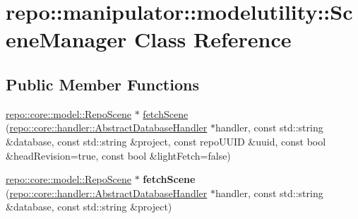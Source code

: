 \hypertarget{classrepo_1_1manipulator_1_1modelutility_1_1_scene_manager}{}\section{repo\+:\+:manipulator\+:\+:modelutility\+:\+:Scene\+Manager Class Reference}
\label{classrepo_1_1manipulator_1_1modelutility_1_1_scene_manager}
\subsection*{Public Member Functions}
\begin{DoxyCompactItemize}
\item 
\hyperlink{classrepo_1_1core_1_1model_1_1_repo_scene}{repo\+::core\+::model\+::\+Repo\+Scene} $\ast$ \hyperlink{classrepo_1_1manipulator_1_1modelutility_1_1_scene_manager_a393159e2171e330dff17c601022b59e6}{fetch\+Scene} (\hyperlink{classrepo_1_1core_1_1handler_1_1_abstract_database_handler}{repo\+::core\+::handler\+::\+Abstract\+Database\+Handler} $\ast$handler, const std\+::string \&database, const std\+::string \&project, const repo\+U\+U\+I\+D \&uuid, const bool \&head\+Revision=true, const bool \&light\+Fetch=false)
\item 
\hypertarget{classrepo_1_1manipulator_1_1modelutility_1_1_scene_manager_a42ef4939c4d06427ba863eb38acd7399}{}\hyperlink{classrepo_1_1core_1_1model_1_1_repo_scene}{repo\+::core\+::model\+::\+Repo\+Scene} $\ast$ {\bfseries fetch\+Scene} (\hyperlink{classrepo_1_1core_1_1handler_1_1_abstract_database_handler}{repo\+::core\+::handler\+::\+Abstract\+Database\+Handler} $\ast$handler, const std\+::string \&database, const std\+::string \&project)\label{classrepo_1_1manipulator_1_1modelutility_1_1_scene_manager_a42ef4939c4d06427ba863eb38acd7399}


\end{DoxyCompactItemize}
